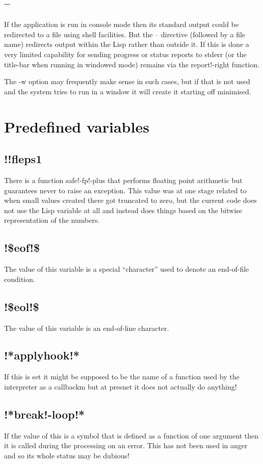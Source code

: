 \documentclass[a4paper,11pt]{article}
\begin{document}
\subsection{\ttfamily --}
If the application is run in console mode then its standard output could
be redirected to a file using shell facilities. But the {\ttfamily --}
directive (followed by a file name) redirects output within the Lisp rather
than outside it. If this is done a very limited capability for sending
progress or status reports to stderr (or the title-bar when running in windowed
mode) remains via the {\ttfamily report!-right} function.

The {\ttfamily -w} option may frequently make sense in such cases, but if that
is not used and the system tries to run in a window it will create it
starting off minimised.

\section{Predefined variables}

\subsection{\ttfamily !!fleps1}
There is a function safe!-fp!-plus that performs floating point
arithmetic but guarantees never to raise an exception. This value was
at one stage related to when small values created there got truncated to zero,
but the current code does not use the Lisp variable at all and instead does
things based on the bitwise representation of the numbers.
\subsection{\ttfamily !\$eof!\$}
The value of this variable is a special ``character'' used to denote an
end-of-file condition.

\subsection{\ttfamily !\$eol!\$}
The value of this variable is an end-of-line character.
\subsection{\ttfamily !*applyhook!*}
If this is set it might be supposed to be the name of a function used
by the interpreter as a callbackm but at presnet it does not actually do
anything!
\subsection{\ttfamily !*break!-loop!*}
If the value of this is a symbol that is defined as a function of one
argument then it is called during the processing on an error. This has not
been used in anger and so its whole status may be dubious!
\end{document}
